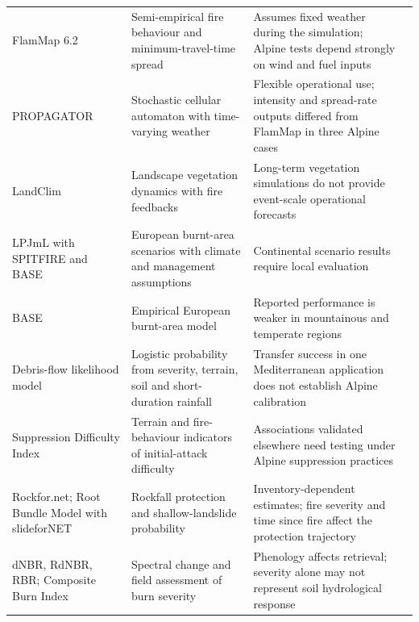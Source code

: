 \documentclass[11pt,a4paper]{article}
\begin{document}
\begin{longtable}{@{}>{\raggedright\arraybackslash}p{2.5cm} >{\raggedright\arraybackslash}p{3.6cm} >{\raggedright\arraybackslash}p{5.0cm} >{\raggedright\arraybackslash}p{3.5cm}@{}}
FlamMap 6.2 & Semi-empirical fire behaviour and minimum-travel-time spread & Assumes fixed weather during the simulation; Alpine tests depend strongly on wind and fuel inputs & \citep{malanchini_modeling_2025} \\
PROPAGATOR & Stochastic cellular automaton with time-varying weather & Flexible operational use; intensity and spread-rate outputs differed from FlamMap in three Alpine cases & \citep{malanchini_modeling_2025} \\
LandClim & Landscape vegetation dynamics with fire feedbacks & Long-term vegetation simulations do not provide event-scale operational forecasts & \citep{schumacher_relative_2006, colombaroli_species_2010} \\
LPJmL with SPITFIRE and BASE & European burnt-area scenarios with climate and management assumptions & Continental scenario results require local evaluation & \citep{billing_future_2026} \\
BASE & Empirical European burnt-area model & Reported performance is weaker in mountainous and temperate regions & \citep{forrest_understanding_2024} \\
Debris-flow likelihood model & Logistic probability from severity, terrain, soil and short-duration rainfall & Transfer success in one Mediterranean application does not establish Alpine calibration & \citep{diakakis_exploring_2023, rengers_evaluating_2024} \\
Suppression Difficulty Index & Terrain and fire-behaviour indicators of initial-attack difficulty & Associations validated elsewhere need testing under Alpine suppression practices & \citep{cardil_assessing_2025} \\
Rockfor.net; Root Bundle Model with slideforNET & Rockfall protection and shallow-landslide probability & Inventory-dependent estimates; fire severity and time since fire affect the protection trajectory & \citep{maringer_temporal_2016, gehring_shallow_2019} \\
dNBR, RdNBR, RBR; Composite Burn Index & Spectral change and field assessment of burn severity & Phenology affects retrieval; severity alone may not represent soil hydrological response & \citep{morresi_mapping_2022, negri_wildfire_2026} \\
\end{longtable}
\endgroup
\end{document}

